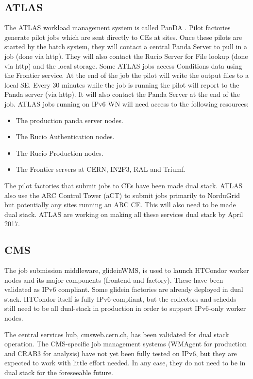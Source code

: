 \documentclass[a4paper]{jpconf}
\begin{document}
\subsection{ATLAS}
The ATLAS workload management system is called PanDA \cite{Panda}.  Pilot factories generate pilot jobs which are sent directly to CEs at sites.  Once these pilots are started by the batch system, they will contact a central Panda Server to pull in a job (done via http).  They will also contact the Rucio Server for File lookup (done via http) and the local storage.  Some ATLAS jobs access Conditions data using the Frontier service.  At the end of the job the pilot will write the output files to a local SE.  Every 30 minutes while the job is running the pilot will report to the Panda server (via http).  It will also contact the Panda Server at the end of the job.  ATLAS jobs running on IPv6 WN will need access to the following resources:
\begin{itemize}
\item The production panda server nodes.
\item The Rucio Authentication nodes.
\item The Rucio Production nodes.
\item The Frontier servers at CERN, IN2P3, RAL and Triumf.
\end{itemize}  
The pilot factories that submit jobs to CEs have been made dual stack.  ATLAS also use the ARC Control Tower (aCT) to submit jobs primarily to NorduGrid but potentially any sites running an ARC CE.  This will also need to be made dual stack.  ATLAS are working on making all these services dual stack by April 2017.


\subsection{CMS}
The job submission middleware, glideinWMS, is used to launch HTCondor worker nodes and its major components (frontend and factory).  These have been validated as IPv6 compliant. Some glidein factories are already deployed in dual stack. HTCondor itself is fully IPv6-compliant, but the collectors and schedds still need to be all dual-stack in production in order to support IPv6-only worker nodes.

The central services hub, cmsweb.cern.ch, has been validated for dual stack operation.  The CMS-specific job management systems (WMAgent for production and CRAB3 for analysis) have not yet been fully tested on IPv6, but they are expected to work with little effort needed. In any case, they do not need to be in dual stack for the foreseeable future.
\end{document}

